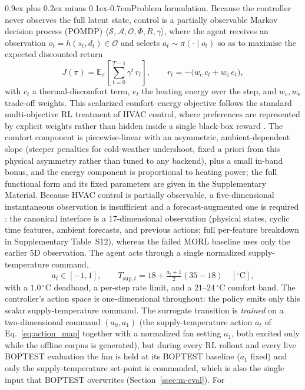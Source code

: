 \documentclass[a4paper,fleqn]{cas-sc}
\makeatletter
\renewcommand\paragraph{\@startsection{paragraph}{4}{\z@}%
 {0.9ex plus 0.2ex minus 0.1ex}{-0.7em}{\normalfont\normalsize\bfseries}}
\newcommand{\suppref}[1]{#1}
\makeatother
\begin{document}
\paragraph{Problem formulation.}
Because the controller never observes the full latent state, control is a partially
observable Markov decision process (POMDP)
$\langle \mathcal{S},\mathcal{A},\mathcal{O},\Phi,R,\gamma\rangle$, where the agent
receives an observation $o_t=h(s_t,d_t)\in\mathcal{O}$ and selects $a_t\sim\pi(\cdot\mid o_t)$
so as to maximise the expected discounted return~\citep{Sutton2018RL}
\begin{equation}
J(\pi)=\mathbb{E}_{\pi}\!\left[\sum_{t=0}^{T-1}\gamma^{t}\,r_t\right],
\qquad
r_t = -\big(w_{\mathrm{c}}\,c_t + w_{\mathrm{e}}\,e_t\big),
\label{eq:m-return}
\end{equation}
with $c_t$ a thermal-discomfort term, $e_t$ the heating energy over the step, and
$w_{\mathrm{c}},w_{\mathrm{e}}$ trade-off weights. This scalarized comfort--energy objective follows the standard multi-objective RL treatment of HVAC control, where preferences are represented by explicit weights rather than hidden inside a single black-box reward \citep{Roijers2013MOSurvey,Yang2019MORL,Hayes2022MOSurvey}. The comfort component is piecewise-linear with an asymmetric, ambient-dependent slope (steeper penalties for cold-weather undershoot, fixed a priori from this physical asymmetry rather than tuned to any backend), plus a small in-band bonus, and the energy component is proportional to heating power; the full functional form and its fixed parameters are given in the Supplementary Material. Because HVAC control is partially observable, a five-dimensional instantaneous observation is insufficient and a forecast-augmented one is required \citep{Gao2024Predictive}: the canonical interface is a 17-dimensional observation (physical states, cyclic time features, ambient forecasts, and previous actions; full per-feature breakdown in Supplementary Table~\suppref{S12}), whereas the failed MORL baseline uses only the earlier 5D observation. The agent acts through a single normalized supply-temperature command,
\begin{equation}
 a_t \in [-1,1],
 \qquad
 T_{\mathrm{sup},t} = 18 + \tfrac{a_t+1}{2}(35-18)\quad [^\circ\mathrm{C}],
 \label{eq:action_map}
\end{equation}
with a $1.0\,^\circ$C deadband, a per-step rate limit, and a $21$--$24\,^\circ$C comfort band. The controller's action space is one-dimensional throughout: the policy emits only this scalar supply-temperature command. The surrogate transition is \emph{trained} on a two-dimensional command $(a_0,a_1)$ (the supply-temperature action $a_t$ of Eq.~\eqref{eq:action_map} together with a normalized fan setting $a_1$, both excited only while the offline corpus is generated), but during every RL rollout and every live BOPTEST evaluation the fan is held at its BOPTEST baseline ($a_1$ fixed) and only the supply-temperature set-point is commanded, which is also the single input that BOPTEST overwrites (Section~\ref{ssec:m-eval}). For
\end{document}
